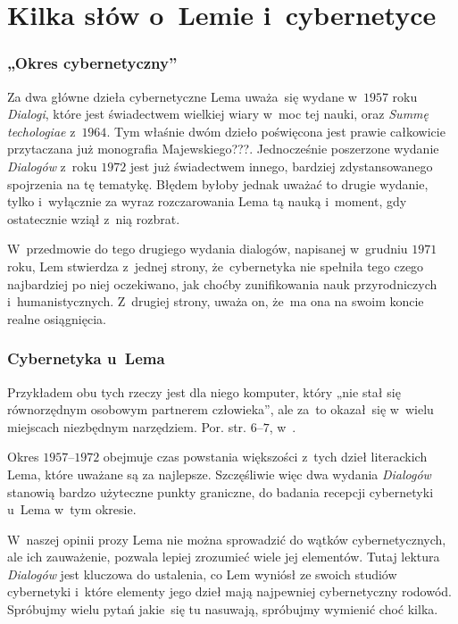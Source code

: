 \documentclass[10pt,t]{beamer}
\begin{document}
\section{Kilka słów o~Lemie i~cybernetyce}


\begin{frame}
  \frametitle{„Okres cybernetyczny”}


  Za dwa główne dzieła cybernetyczne Lema uważa~się wydane w~$1957$ roku
  \textit{Dialogi}, które jest świadectwem wielkiej wiary w~moc tej nauki,
  oraz \textit{Summę techologiae} z~$1964$. Tym właśnie dwóm dzieło
  poświęcona jest prawie całkowicie przytaczana już monografia
  Majewskiego???. Jednocześnie poszerzone wydanie \textit{Dialogów} z~roku
  $1972$ jest już świadectwem innego, bardziej zdystansowanego
  spojrzenia na tę tematykę. Błędem byłoby jednak uważać to drugie wydanie,
  tylko i~wyłącznie za wyraz rozczarowania Lema tą nauką i~moment, gdy
  ostatecznie wziął z~nią rozbrat.

  W~przedmowie do tego drugiego wydania dialogów, napisanej w~grudniu
  $1971$ roku, Lem stwierdza z~jednej strony, że~cybernetyka nie spełniła
  tego czego najbardziej po niej oczekiwano, jak choćby zunifikowania
  nauk przyrodniczych i~humanistycznych. Z~drugiej strony, uważa on,
  że~ma ona na swoim koncie realne osiągnięcia.

\end{frame}





\begin{frame}
  \frametitle{Cybernetyka u~Lema}


  Przykładem obu tych rzeczy jest dla niego komputer, który „nie stał się
  równorzędnym osobowym partnerem człowieka”, ale za~to okazał~się w~wielu
  miejscach niezbędnym narzędziem. Por. str. $6\text{--}7$,
  w~\parencite{Lem-Dialogi-Vol-I-Pub-1996}.

  Okres $1957\text{--}1972$ obejmuje czas powstania większości z~tych
  dzieł literackich Lema, które uważane są za najlepsze. Szczęśliwie więc
  dwa wydania \textit{Dialogów} stanowią bardzo użyteczne punkty graniczne,
  do badania recepcji cybernetyki u~Lema w~tym okresie.

  W~naszej opinii prozy Lema \alert{nie} można sprowadzić do wątków
  cybernetycznych, ale ich zauważenie, pozwala lepiej zrozumieć wiele
  jej elementów. Tutaj lektura \textit{Dialogów} jest kluczowa do ustalenia,
  co Lem wyniósł ze swoich studiów cybernetyki i~które elementy jego
  dzieł mają najpewniej cybernetyczny rodowód. Spróbujmy wielu pytań
  jakie~się tu nasuwają, spróbujmy wymienić choć kilka.

\end{frame}
\end{document}
